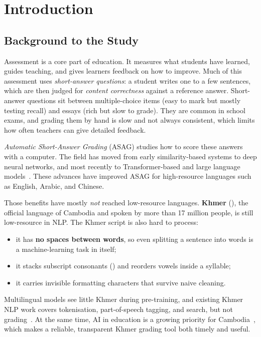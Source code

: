 \chapter{Introduction}
\label{ch:intro}

\section{Background to the Study}
Assessment is a core part of education. It measures what students have learned, guides teaching, and
gives learners feedback on how to improve. Much of this assessment uses \emph{short-answer questions}:
a student writes one to a few sentences, which are then judged for \emph{content correctness} against
a reference answer. Short-answer questions sit between multiple-choice items (easy to mark but mostly
testing recall) and essays (rich but slow to grade). They are common in school exams, and grading
them by hand is slow and not always consistent, which limits how often teachers can give detailed
feedback.

\emph{Automatic Short-Answer Grading} (ASAG) studies how to score these answers with a computer. The
field has moved from early similarity-based systems to deep neural networks, and most recently to
Transformer-based and large language models~\citep{sung2022survey,devlin2019bert}. These advances have
improved ASAG for high-resource languages such as English, Arabic, and Chinese.

Those benefits have mostly \emph{not} reached low-resource languages. \textbf{Khmer}
(), the official language of Cambodia and spoken by more than 17 million people, is
still low-resource in NLP. The Khmer script is also hard to process:

\begin{itemize}[leftmargin=1.4em]
  \item it has \textbf{no spaces between words}, so even splitting a sentence into words is a
  machine-learning task in itself;
  \item it stacks subscript consonants () and reorders vowels inside a syllable;
  \item it carries invisible formatting characters that survive naive cleaning.
\end{itemize}

Multilingual models see little Khmer during pre-training, and existing Khmer NLP work covers
tokenisation, part-of-speech tagging, and search, but not grading~\citep{buoy2022khmer,khmernltk2020}.
At the same time, AI in education is a growing priority for Cambodia~\citep{huot2025cambodia}, which
makes a reliable, transparent Khmer grading tool both timely and useful.

